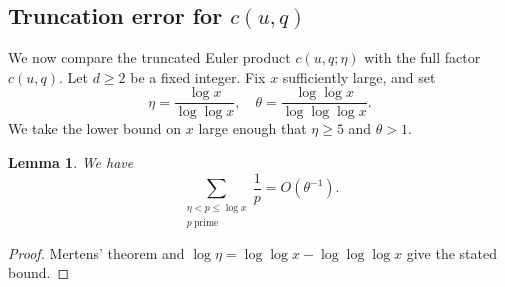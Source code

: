 \documentclass[12pt,reqno]{amsart}
\numberwithin{equation}{section}
\newtheorem{lemma}[theorem]{Lemma}
\theoremstyle{definition}
\renewcommand{\le}{\leqslant}
\renewcommand{\geq}{\geqslant}
\renewcommand{\ge}{\geqslant}
\begin{document}
\subsection{Truncation error for $c(u,q)$}
We now compare the truncated Euler product $c(u,q; \eta)$ with the full factor $c(u,q)$.
Let $d \geq 2$ be a fixed integer.
Fix $x$ sufficiently large, and set
\[
\eta = \frac{\log x}{\log \log x}, \quad \theta = \frac{\log \log x}{\log \log \log x}.
\]
We take the lower bound on $x$ large enough that $\eta\ge5$ and $\theta>1$.
\begin{lemma}\label{lem:mert}
We have
\[
\sum_{\substack{\eta<p\le\log x \\ p~\text{prime}}}\frac1p=O(\theta^{-1}).
\]
\end{lemma}
\begin{proof}
Mertens' theorem and $\log\eta=\log\log x-\log\log\log x$ give the stated bound.
\end{proof}
\end{document}

